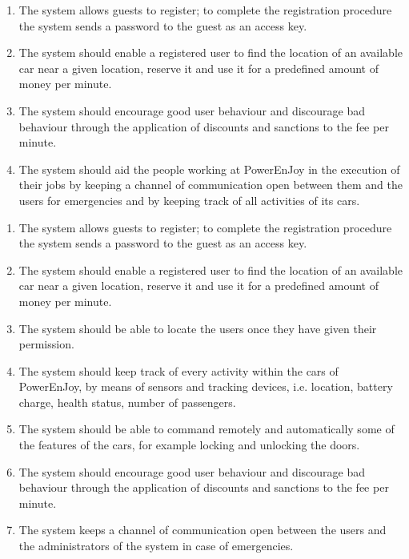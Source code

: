 						
			\begin{enumerate}
				\item The system allows guests to register; to complete the registration procedure the system sends a password to the guest as an access key. 
				\item The system should enable a registered user to find the location of an available car near a given location, reserve it and use it for a predefined amount of money per minute. 
				\item The system should encourage good user behaviour and discourage bad behaviour through the application of discounts and sanctions to the fee per minute. 
				\item The system should aid the people working at PowerEnJoy in the execution of their jobs by keeping a channel of communication open between them and the users for emergencies and by keeping track of all activities of its cars. 
			\end{enumerate}									
			
			
			
			\begin{enumerate}
				\item The system allows guests to register; to complete the registration procedure the system sends a password to the guest as an access key.
				\item The system should enable a registered user to find the location of an available car near a given location, reserve it and use it for a predefined amount of money per minute. 
				\item The system should be able to locate the users once they have given their permission.
				\item The system should keep track of every activity within the cars of PowerEnJoy, by means of sensors and tracking devices, i.e. location, battery charge, health status, number of passengers. 
				\item The system should be able to command remotely and automatically some of the features of the cars, for example locking and unlocking the doors. 
				\item The system should encourage good user behaviour and discourage bad behaviour through the application of discounts and sanctions to the fee per minute. 
				\item The system keeps a channel of communication open between the users and the administrators of the system in case of emergencies. 
			\end{enumerate}
			

